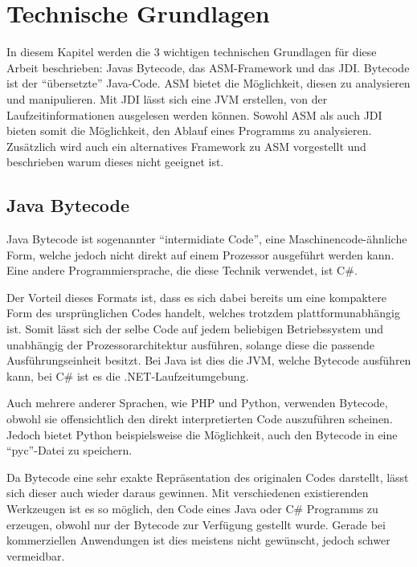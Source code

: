 
\chapter{Technische Grundlagen}

In diesem Kapitel werden die 3 wichtigen technischen Grundlagen für diese Arbeit beschrieben: Javas Bytecode, das ASM-Framework und das \ac{JDI}. Bytecode ist der "`übersetzte"' Java-Code. ASM bietet die Möglichkeit, diesen zu analysieren und manipulieren. Mit \ac{JDI} lässt sich eine \ac{JVM} erstellen, von der Laufzeitinformationen ausgelesen werden können. Sowohl ASM als auch \ac{JDI} bieten somit die Möglichkeit, den Ablauf eines Programms zu analysieren. Zusätzlich wird auch ein alternatives Framework zu ASM vorgestellt und beschrieben warum dieses nicht geeignet ist.

\section{Java Bytecode} 

Java Bytecode ist sogenannter "`intermidiate Code"', eine Maschinencode-ähnliche Form, welche jedoch nicht direkt auf einem Prozessor ausgeführt werden kann. Eine andere Programmiersprache, die diese Technik verwendet, ist C\#.

Der Vorteil dieses Formats ist, dass es sich dabei bereits um eine kompaktere Form des ursprünglichen Codes handelt, welches trotzdem plattformunabhängig ist. Somit lässt sich der selbe Code auf jedem beliebigen Betriebssystem und unabhängig der Prozessorarchitektur ausführen, solange diese die passende Ausführungseinheit besitzt.
Bei Java ist dies die \ac{JVM}, welche Bytecode ausführen kann, bei C\# ist es die .NET-Laufzeitumgebung.

Auch mehrere anderer Sprachen, wie \ac{PHP} und Python, verwenden Bytecode, obwohl sie offensichtlich den direkt interpretierten Code auszuführen scheinen. Jedoch bietet Python beispielsweise die Möglichkeit, auch den Bytecode in eine "`pyc"'-Datei zu speichern.

Da Bytecode eine sehr exakte Repräsentation des originalen Codes darstellt, lässt sich dieser auch wieder daraus gewinnen. Mit verschiedenen existierenden Werkzeugen ist es so möglich, den Code eines Java oder C\# Programms zu erzeugen, obwohl nur der Bytecode zur Verfügung gestellt wurde. Gerade bei kommerziellen Anwendungen ist dies meistens nicht gewünscht, jedoch schwer vermeidbar.

